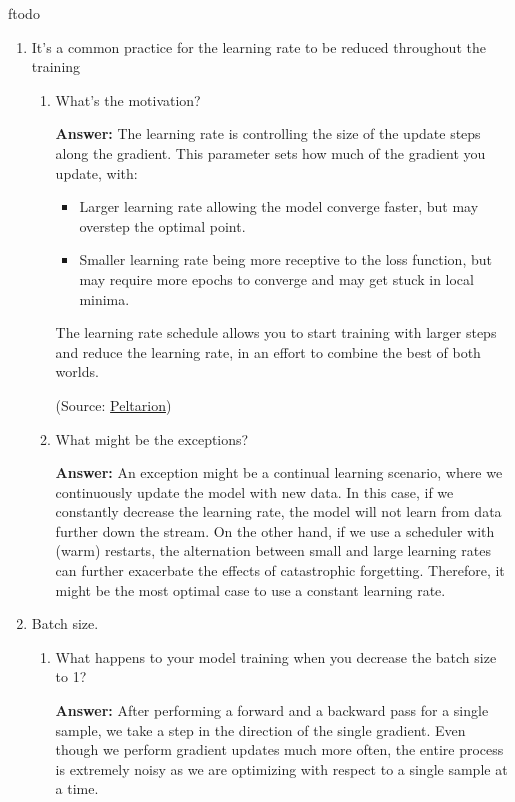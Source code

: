 ƒtodo\documentclass{article}
\newenvironment{QandA}{\begin{enumerate}[label=\arabic*.]}{\end{enumerate}}
\newenvironment{InnerQandA}{\begin{enumerate}[label=\roman*.]}{\end{enumerate}}
\newenvironment{answer}{\par\normalfont \textbf{Answer:}}{}
\begin{document}
\begin{QandA}
    \item It’s a common practice for the learning rate to be reduced throughout the training
    \begin{InnerQandA}
        \item What’s the motivation?
        \begin{answer}
            The learning rate is controlling the size of the update steps along the gradient. This parameter sets how much of the gradient you update, with:
            \begin{itemize}
                \item Larger learning rate allowing the model converge faster, but may overstep the optimal point.
                \item Smaller learning rate being more receptive to the loss function, but may require more epochs to converge and may get stuck in local minima.
            \end{itemize}
            The learning rate schedule allows you to start training with larger steps and reduce the learning rate, in an effort to combine the best of both worlds.

            (Source: \href{https://peltarion.com/knowledge-center/modeling-view/run-a-model/optimization-principles-(in-deep-learning)/learning-rate-schedule}{Peltarion})
        \end{answer}

        \item What might be the exceptions?
        \begin{answer}
            An exception might be a continual learning scenario, where we continuously update the model with new data. In this case, if we constantly decrease the learning rate, the model will not learn from data further down the stream. On the other hand, if we use a scheduler with (warm) restarts, the alternation between small and large learning rates can further exacerbate the effects of catastrophic forgetting. Therefore, it might be the most optimal case to use a constant learning rate.
        \end{answer}
    \end{InnerQandA}

    \item Batch size.
    \begin{InnerQandA}
        \item What happens to your model training when you decrease the batch size to 1?
        \begin{answer}
            After performing a forward and a backward pass for a single sample, we take a step in the direction of the single gradient. Even though we perform gradient updates much more often, the entire process is extremely noisy as we are optimizing with respect to a single sample at a time.
        \end{answer}


\end{InnerQandA}
\end{QandA}
\end{document}
